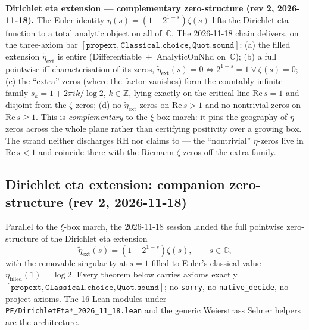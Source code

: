 \item \textbf{Dirichlet eta extension — complementary zero-structure
(rev 2, 2026-11-18).}  The Euler identity
$\eta(s) = (1 - 2^{1-s}) \zeta(s)$ lifts the Dirichlet eta function
to a total analytic object on all of~$\mathbb{C}$.  The 2026-11-18
chain delivers, on the three-axiom bar
$[\mathtt{propext}, \mathtt{Classical.choice}, \mathtt{Quot.sound}]$:
(a) the filled extension $\widetilde{\eta}_{\mathrm{ext}}$ is entire
(Differentiable~$+$~AnalyticOnNhd on~$\mathbb{C}$); (b) a full
pointwise iff characterisation of its zeros,
$\widetilde{\eta}_{\mathrm{ext}}(s) = 0 \iff 2^{1-s} = 1 \lor
\zeta(s) = 0$; (c) the ``extra'' zeros (where the factor vanishes)
form the countably infinite family
$s_k = 1 + 2\pi i k / \log 2$, $k \in \mathbb{Z}$, lying exactly on
the critical line $\mathrm{Re}\,s = 1$ and disjoint from the
$\zeta$-zeros; (d) no $\widetilde{\eta}_{\mathrm{ext}}$-zeros on
$\mathrm{Re}\,s > 1$ and no nontrivial zeros on $\mathrm{Re}\,s \ge 1$.
This is \emph{complementary} to the $\xi$-box march: it pins the
geography of $\eta$-zeros across the whole plane rather than
certifying positivity over a growing box.  The strand neither
discharges RH nor claims to --- the ``nontrivial'' $\eta$-zeros
live in $\mathrm{Re}\,s < 1$ and coincide there with the Riemann
$\zeta$-zeros off the extra family.



\subsection{Dirichlet eta extension: companion zero-structure (rev 2, 2026-11-18)}
\label{sec:ch20-rev2-eta-structure}

Parallel to the $\xi$-box march, the 2026-11-18 session landed the
full pointwise zero-structure of the Dirichlet eta extension
\[
\widetilde{\eta}_{\mathrm{ext}}(s) = (1 - 2^{1-s}) \zeta(s),
\qquad s \in \mathbb{C},
\]
with the removable singularity at $s = 1$ filled to Euler's classical
value $\widetilde{\eta}_{\mathrm{filled}}(1) = \log 2$.  Every theorem
below carries axioms exactly
$[\mathtt{propext}, \mathtt{Classical.choice}, \mathtt{Quot.sound}]$;
no \texttt{sorry}, no \texttt{native\_decide}, no project axioms.
The 16 Lean modules under \texttt{PF/DirichletEta*\_2026\_11\_18.lean}
and the generic Weierstrass Selmer helpers are the architecture.

